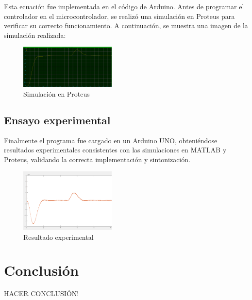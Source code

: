\documentclass[letterpaper, 10 pt, conference]{ieeeconf}  %
\begin{document}
Esta ecuación fue implementada en el código de Arduino. 
Antes de programar el controlador en el microcontrolador, se realizó una simulación en Proteus para verificar su correcto funcionamiento. A continuación, se muestra una imagen de la simulación realizada:

\begin{figure}[htpb]
  \centering
  \includegraphics[width=0.43\textwidth]{./IMAGENES/pid7.png}
  \caption{Simulación en Proteus}
  \label{fig:pid7}
\end{figure}

\subsection{Ensayo experimental}

Finalmente el programa fue cargado en un Arduino UNO, obteniéndose resultados experimentales consistentes con las simulaciones en MATLAB y Proteus, validando la correcta implementación y sintonización.

\begin{figure}[htpb]
  \centering
  \includegraphics[width=0.43\textwidth]{./IMAGENES/pid8.png}
  \caption{Resultado experimental}
  \label{fig:pid8}
\end{figure}

\section{Conclusión}

HACER CONCLUSIÓN!
\end{document}

